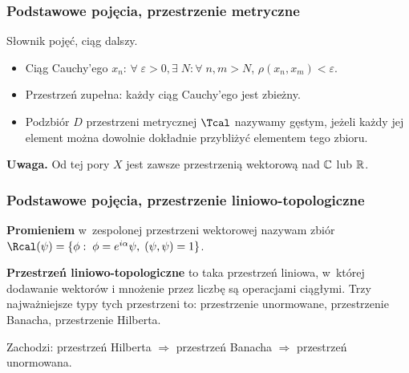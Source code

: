 \documentclass[10pt,t]{beamer}
\begin{document}
\begin{frame}
  \frametitle{Podstawowe pojęcia, przestrzenie metryczne}


  Słownik pojęć, ciąg dalszy.
  \begin{itemize}

  \item Ciąg Cauchy’ego $x_{ n }$: $\forall \; \varepsilon > 0, \exists \; N: \forall \; n, m > N$, $
    \rho ( x_{ n }, x_{ m } ) < \varepsilon $.

  \item Przestrzeń zupełna: każdy ciąg Cauchy’ego jest zbieżny.

  \item Podzbiór $D$ przestrzeni metrycznej $\Tcal$ nazywamy gęstym, jeżeli
    każdy jej element można dowolnie dokładnie przybliżyć elementem tego
    zbioru.

  \end{itemize}

  \textbf{Uwaga.}
  Od tej pory $X$ jest zawsze przestrzenią wektorową nad $\mathbb{C}$ lub $\mathbb{R}$.


\end{frame}





\begin{frame}
  \frametitle{Podstawowe pojęcia, przestrzenie liniowo-topologiczne}


  \textbf{Promieniem} w~zespolonej przestrzeni wektorowej nazywam zbiór
  $\Rcal ( \psi ) = \{ \phi : \; \phi = e^{ i \alpha } \psi ,\; ( \psi, \psi ) = 1 \}$.

  \textbf{Przestrzeń liniowo-topologiczne} to taka przestrzeń liniowa,
  w~której dodawanie wektorów i mnożenie przez liczbę są operacjami ciągłymi.
  Trzy najważniejsze typy tych przestrzeni to: przestrzenie unormowane,
  przestrzenie Banacha, przestrzenie Hilberta.

  Zachodzi: przestrzeń Hilberta $\Rightarrow$ przestrzeń Banacha $\Rightarrow$ przestrzeń
  unormowana.

\end{frame}
\end{document}
